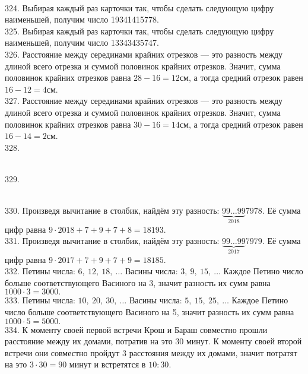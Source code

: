 \begin{figure}[ht!]
\end{figure}\\
324. Выбирая каждый раз карточки так, чтобы сделать следующую цифру наименьшей, получим число 19341415778.\\
325. Выбирая каждый раз карточки так, чтобы сделать следующую цифру наименьшей, получим число 13343435747.\\
326. Расстояние между серединами крайних отрезков --- это разность между длиной всего отрезка и суммой половинок крайних отрезков. Значит, сумма половинок крайних отрезков равна $28-16=12$см, а тогда средний отрезок равен $16-12=4$см.\\
327. Расстояние между серединами крайних отрезков --- это разность между длиной всего отрезка и суммой половинок крайних отрезков. Значит, сумма половинок крайних отрезков равна $30-16=14$см, а тогда средний отрезок равен $16-14=2$см.\\
328. \begin{figure}[ht!]
\end{figure}\\
329. \begin{figure}[ht!]
\end{figure}\\
330. Произведя вычитание в столбик, найдём эту разность: $\underbrace{99\ldots99}_{2018}7978.$ Её сумма цифр равна $9\cdot2018+7+9+7+8=18193.$\\
331. Произведя вычитание в столбик, найдём эту разность: $\underbrace{99\ldots99}_{2017}7979.$ Её сумма цифр равна $9\cdot2017+7+9+7+9=18185.$\\
332. Петины числа: $6,\ 12,\ 18,\ \ldots$ Васины числа: $3,\ 9,\ 15,\ \ldots$ Каждое Петино число больше соответствующего Васиного на 3, значит разность их сумм равна $1000\cdot3=3000.$\\
333. Петины числа: $10,\ 20,\ 30,\ \ldots$ Васины числа: $5,\ 15,\ 25,\ \ldots$ Каждое Петино число больше соответствующего Васиного на 5, значит разность их сумм равна $1000\cdot5=5000.$\\
334. К моменту своей первой встречи Крош и Бараш совместно прошли расстояние между их домами, потратив на это 30 минут. К моменту своей второй встречи они совместно пройдут 3 расстояния между их домами, значит потратят на это $3\cdot30=90$ минут и встретятся в $10:30.$\\
